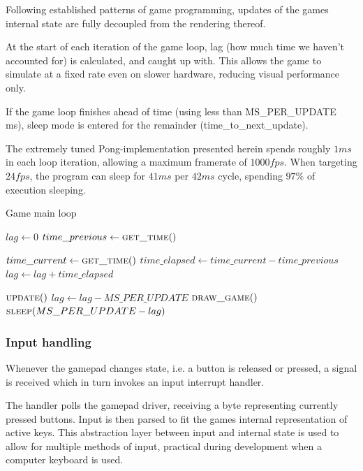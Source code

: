 Following established patterns of game programming, updates of the games
internal state are fully decoupled from the rendering thereof.

At the start of each iteration of the game loop, lag (how much time we haven't
accounted for) is calculated, and caught up with.
This allows the game to simulate at a fixed rate even on slower hardware,
reducing visual performance only.

If the game loop finishes ahead of time (using less than MS\_PER\_UPDATE ms),
sleep mode is entered for the remainder (time\_to\_next\_update).

The extremely tuned Pong-implementation presented herein spends roughly $ 1 ms $
in each loop iteration, allowing a maximum framerate of $ 1000 fps $.
When targeting $ 24 fps $, the program can sleep for $ 41 ms $ per $ 42 ms $ cycle,
spending $ 97 \% $ of execution sleeping.

\begin{algorithm}
  \caption{Game main loop}
  \begin{algorithmic}
    \State $lag \gets 0$
    \State $time\_previous \gets \Call{get\_time}{\null}$

    \Loop
      \State $time\_current \gets \Call{get\_time}{\null}$
      \State $time\_elapsed \gets time\_current - time\_previous$
      \State $lag \gets lag + time\_elapsed$

        \State $\Call{update}{\null}$
        \State $lag \gets lag - MS\_PER\_UPDATE$
      \EndWhile
      \State $\Call{draw\_game}{\null}$
      \State $\Call{sleep}{MS\_PER\_UPDATE - lag}$
    \EndLoop
  \end{algorithmic}
\end{algorithm}

\subsubsection{Input handling}
Whenever the gamepad changes state, i.e. a button is released or pressed,
a signal is received which in turn invokes an input interrupt handler.

The handler polls the gamepad driver, receiving a byte representing currently
pressed buttons. Input is then parsed to fit the games internal representation
of active keys. This abstraction layer between input and internal state is used
to allow for multiple methods of input, practical during development when a
computer keyboard is used.


